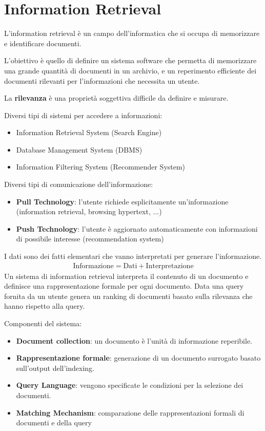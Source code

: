\chapter{Information Retrieval}

L'information retrieval è un campo dell'informatica che si occupa di memorizzare e identificare documenti.

L'obiettivo è quello di definire un sistema software che permetta di memorizzare una grande quantità di documenti
in un archivio, e un reperimento efficiente dei documenti rilevanti per l'informazioni che necessita un utente.

La \textbf{rilevanza} è una proprietà soggettiva difficile da definire e misurare.

Diversi tipi di sistemi per accedere a informazioni:
\begin{itemize}
  \item Information Retrieval System (Search Engine)
  \item Database Management System (DBMS)
  \item Information Filtering System (Recommender System)
\end{itemize}

Diversi tipi di comunicazione dell'informazione:
\begin{itemize}
  \item \textbf{Pull Technology}: l'utente richiede esplicitamente un'informazione (information retrieval, browsing hypertext, ...)
  \item \textbf{Push Technology}: l'utente è aggiornato automaticamente con informazioni di possibile interesse (recommendation system)
\end{itemize}

I dati sono dei fatti elementari che vanno interpretati per generare l'informazione.
%
\begin{align*}
  \text{Informazione} = \text{Dati} + \text{Interpretazione}
\end{align*}
%
Un sistema di information retrieval interpreta il contenuto di un documento e definisce una rappresentazione formale per ogni documento.
Data una query fornita da un utente genera un ranking di documenti basato sulla rilevanza che hanno rispetto alla query.

\pagebreak

Componenti del sistema:
\begin{itemize}
  \item \textbf{Document collection}: un documento è l'unità di informazione reperibile.
  \item \textbf{Rappresentazione formale}: generazione di un documento surrogato basato sull'output dell'indexing.
  \item \textbf{Query Language}: vengono specificate le condizioni per la selezione dei documenti.
  \item \textbf{Matching Mechanism}: comparazione delle rappresentazioni formali di documenti e della query
\end{itemize}

